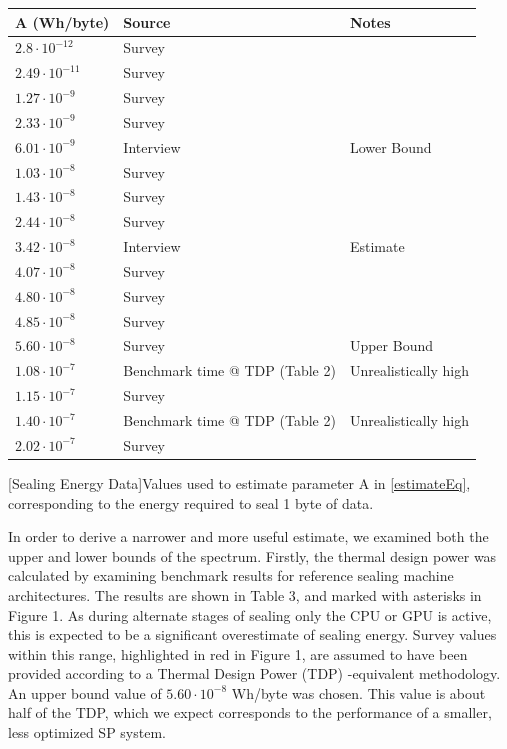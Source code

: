 \documentclass[9pt, oneside]{article}   	%
\begin{document}
\begin{multicols}{2}

\small
 \noindent \begin{tabular}{|| p{2cm} | p{2.5cm} | p{2.5cm} ||} 
 \hline
 \textbf{A (Wh/byte)} & \textbf{Source} & \textbf{Notes}\\
   \hline
 $2.8 \cdot 10^{-12}$ & Survey &  \\
  \hline
 $2.49\cdot 10^{-11}$ & Survey &  \\
   \hline
$1.27\cdot 10^{-9}$ & Survey &  \\
  \hline
$2.33\cdot 10^{-9}$ & Survey &  \\
  \hline
$6.01\cdot 10^{-9}$ & Interview & Lower Bound \\
  \hline
$1.03\cdot 10^{-8}$ & Survey &  \\
  \hline
$1.43\cdot 10^{-8}$ & Survey &  \\
  \hline
$2.44\cdot 10^{-8}$ & Survey &  \\
  \hline
$3.42\cdot 10^{-8}$ & Interview & Estimate \\
  \hline
$4.07\cdot 10^{-8}$ & Survey &  \\
  \hline
$4.80\cdot 10^{-8}$ & Survey &  \\
  \hline
$4.85\cdot 10^{-8}$ & Survey &  \\
  \hline
$5.60\cdot 10^{-8}$ & Survey & Upper Bound \\
  \hline
$1.08\cdot 10^{-7}$ & Benchmark time @ TDP (Table 2) & Unrealistically high \\
  \hline
$1.15\cdot 10^{-7}$ & Survey &  \\
  \hline
$1.40\cdot 10^{-7}$ & Benchmark time @ TDP (Table 2) & Unrealistically high \\
  \hline
$2.02\cdot 10^{-7}$ & Survey &  \\
  \hline
\end{tabular}
  [Sealing Energy Data]{Values used to estimate parameter A in \ref{estimateEq}, corresponding to the energy required to seal 1 byte of data.}
\label{sealingEnergyTable}
\normalsize{}

In order to derive a narrower and more useful estimate, we examined both the upper and lower bounds of the spectrum. Firstly, the thermal design power was calculated by examining benchmark results for reference sealing machine architectures. The results are shown in Table 3, and marked with asterisks in Figure 1. As during alternate stages of sealing only the CPU or GPU is active, this is expected to be a significant overestimate of sealing energy. Survey values within this range, highlighted in red in Figure 1, are assumed to have been provided according to a Thermal Design Power (TDP) -equivalent methodology. An upper bound value of $5.60 \cdot 10^{-8}$ Wh/byte was chosen. This value is about half of the TDP, which we expect corresponds to the performance of a smaller, less optimized SP system.


\end{multicols}
\end{document}
